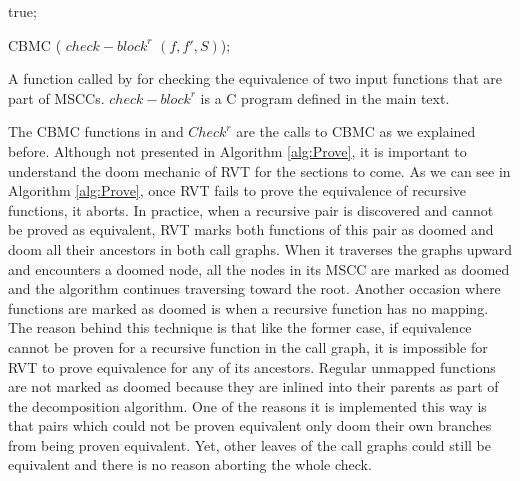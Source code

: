 \begin{algorithm}
\begin{algorithmic}[1]


 true; \EndIf

 CBMC ( $check-block^r$  $(f,f',S)$); \EndFunction
\end{algorithmic}
\caption{A function called by  for checking the equivalence of two input functions that are part of MSCCs. $check-block^r$ is a C program defined in the main text.}
\label{alg:Checkr}
\end{algorithm}


The CBMC functions in  and $Check^r$ are the calls to CBMC as we explained before.
Although not presented in Algorithm \ref{alg:Prove}, it is important to understand the doom mechanic of RVT for the sections to come. As we can see in Algorithm \ref{alg:Prove}, once RVT fails to prove the equivalence of recursive functions, it aborts. In practice, when a recursive pair is discovered and cannot be proved as equivalent, RVT marks both functions of this pair as doomed and doom all their ancestors in both call graphs. When it traverses the graphs upward and encounters a doomed node, all the nodes in its MSCC are marked as doomed and the algorithm continues traversing toward the root. Another occasion where functions are marked as doomed is when a recursive function has no mapping. The reason behind this technique is that like the former case, if equivalence cannot be proven for a recursive function in the call graph, it is impossible for RVT to prove equivalence for any of its ancestors. Regular unmapped functions are not marked as doomed because they are inlined into their parents as part of the decomposition algorithm. One of the reasons it is implemented this way is that pairs which could not be proven equivalent only doom their own branches from being proven equivalent. Yet, other leaves of the call graphs could still be equivalent and there is no reason aborting the whole check. 

